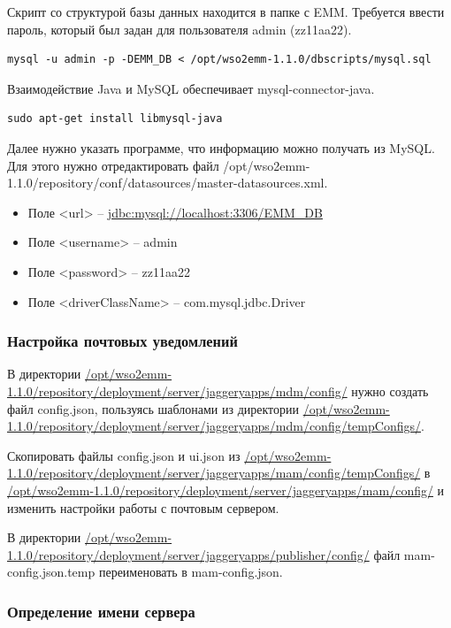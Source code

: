 \documentclass[a4paper, 12pt]{article}		%
\begin{document}
Скрипт со структурой базы данных находится в папке с EMM. Требуется ввести пароль, который был задан для пользователя admin (zz11aa22).

\begin{Verbatim}[frame=single]
mysql -u admin -p -DEMM_DB < /opt/wso2emm-1.1.0/dbscripts/mysql.sql
\end{Verbatim}

Взаимодействие Java и MySQL обеспечивает mysql-connector-java. 

\begin{Verbatim}[frame=single]
sudo apt-get install libmysql-java
\end{Verbatim}

Далее нужно указать программе, что информацию можно получать из MySQL. Для этого нужно отредактировать файл /opt/wso2emm-1.1.0/repository/conf/datasources/master-datasources.xml.

\begin{itemize}
\item Поле <url> -- \url{jdbc:mysql://localhost:3306/EMM_DB}
\item Поле <username> -- admin
\item Поле <password> -- zz11aa22
\item Поле <driverClassName> -- com.mysql.jdbc.Driver
\end{itemize}

\subsubsection{Настройка почтовых уведомлений}

В директории \url{/opt/wso2emm-1.1.0/repository/deployment/server/jaggeryapps/mdm/config/} нужно создать файл config.json, пользуясь шаблонами из директории \url{/opt/wso2emm-1.1.0/repository/deployment/server/jaggeryapps/mdm/config/tempConfigs/}.

Скопировать файлы config.json и ui.json из \url{/opt/wso2emm-1.1.0/repository/deployment/server/jaggeryapps/mam/config/tempConfigs/} в \url{/opt/wso2emm-1.1.0/repository/deployment/server/jaggeryapps/mam/config/} и изменить настройки работы с почтовым сервером.

В директории \url{/opt/wso2emm-1.1.0/repository/deployment/server/jaggeryapps/publisher/config/} файл mam-config.json.temp переименовать в mam-config.json.

\subsubsection{Определение имени сервера}
\end{document}
